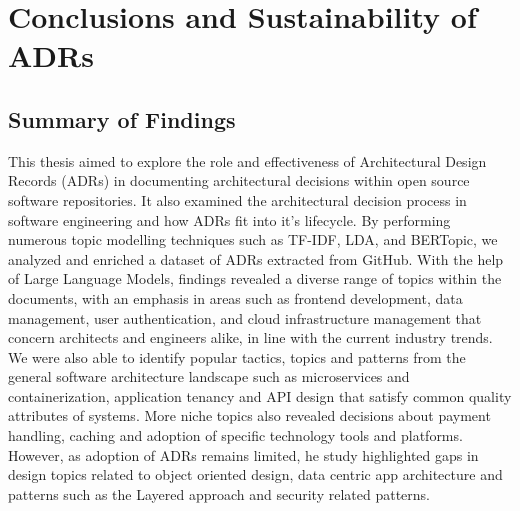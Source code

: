 \chapter{Conclusions and Sustainability of ADRs} 

    \section{Summary of Findings}
        This thesis aimed to explore the role and effectiveness of Architectural Design Records (ADRs) in documenting architectural decisions within open source software repositories. It also examined the architectural decision process in software engineering and how ADRs fit into it's lifecycle. By performing numerous topic modelling techniques such as TF-IDF, LDA, and BERTopic, we analyzed and enriched a dataset of ADRs extracted from GitHub.
        With the help of Large Language Models, findings revealed a diverse range of topics within the documents, with an emphasis in areas such as frontend development, data management, user authentication, and cloud infrastructure management that concern architects and engineers alike, in line with the current industry trends. We were also able to identify popular tactics, topics and patterns from the general software architecture landscape such as microservices and containerization, application tenancy and API design that satisfy common quality attributes of systems. More niche topics also revealed decisions about payment handling, caching and adoption of specific technology tools and platforms. However, as adoption of ADRs remains limited, he study highlighted gaps in design topics related to object oriented design, data centric app architecture and patterns such as the Layered approach and security related patterns.
